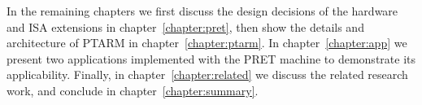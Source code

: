 In the remaining chapters we first discuss the design decisions of the hardware and ISA extensions in chapter~\ref{chapter:pret}, then show the details and architecture of PTARM in chapter~\ref{chapter:ptarm}.
In chapter~\ref{chapter:app} we present two applications implemented with the PRET machine to demonstrate its applicability.
Finally, in chapter~\ref{chapter:related} we discuss the related research work, and conclude in chapter~\ref{chapter:summary}.









